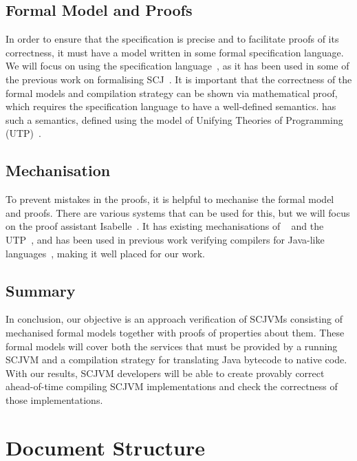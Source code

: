 \subsection{Formal Model and Proofs}

In order to ensure that the specification is precise and to facilitate
proofs of its correctness, it must have a model written in some formal
specification language.
We will focus on using the \Circus{} specification
language~\cite{oliveira2009}, as it has been used in some of the
previous work on formalising SCJ~\cite{cavalcanti2011,
  cavalcanti2013}.
It is important that the correctness of the formal models and
compilation strategy can be shown via mathematical proof, which
requires the specification language to have a well-defined semantics.
\Circus{} has such a semantics, defined using the model of Unifying
Theories of Programming (UTP)~\cite{hoare1998}.

\subsection{Mechanisation}

To prevent mistakes in the proofs, it is helpful to mechanise the
formal model and proofs.
There are various systems that can be used for this, but we will focus
on the proof assistant Isabelle~\cite{nipkow2002, nipkow2014}.
It has existing mechanisations of \Circus{}~\cite{feliachi2012} and
the UTP~\cite{foster2015}, and has been used in previous work
verifying compilers for Java-like languages~\cite{klein2006,
  strecker2002, lochbihler2010}, making it well placed for our work.

\subsection{Summary}

In conclusion, our objective is an approach verification of SCJVMs
consisting of mechanised formal models together with proofs of
properties about them.
These formal models will cover both the services that must be provided
by a running SCJVM and a compilation strategy for translating Java
bytecode to native code.
With our results, SCJVM developers will be able to create provably
correct ahead-of-time compiling SCJVM implementations and check the
correctness of those implementations.

\section{Document Structure}

